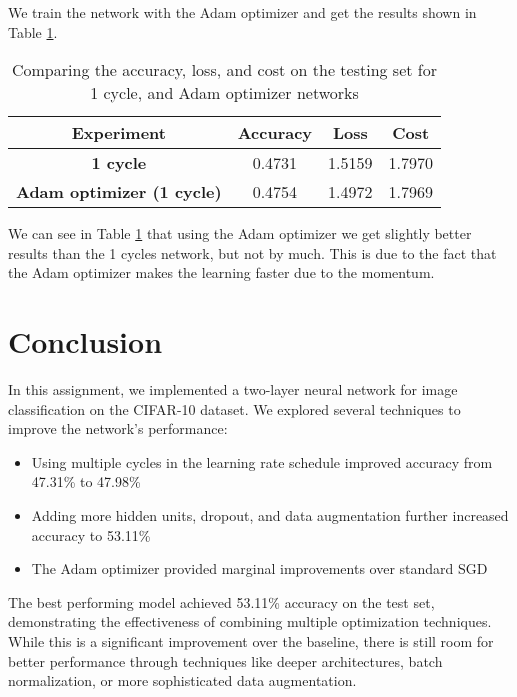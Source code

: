 \documentclass{article}
\begin{document}

We train the network with the Adam optimizer and get the results shown in Table \ref{tab:experiment4}.

\begin{table}[h!]
    \centering
    \begin{tabular}{|c|c|c|c|}
    \hline
    \textbf{Experiment} & \textbf{Accuracy} & \textbf{Loss} & \textbf{Cost} \\
    \hline
    \textbf{1 cycle} & 0.4731 & 1.5159 & 1.7970 \\
    \textbf{Adam optimizer (1 cycle)} & 0.4754 & 1.4972 & 1.7969 \\
    \hline
    \end{tabular}
    \caption{Comparing the accuracy, loss, and cost on the testing set for 1 cycle, and Adam optimizer networks}
    \label{tab:experiment4}
\end{table}

We can see in Table \ref{tab:experiment4} that using the Adam optimizer we get slightly better results than the 1 cycles network, but not by much. This is due to the fact that the Adam optimizer makes the learning faster due to the momentum.


\newpage

\section{Conclusion}
In this assignment, we implemented a two-layer neural network for image classification on the CIFAR-10 dataset. We explored several techniques to improve the network's performance:

\begin{itemize}
    \item Using multiple cycles in the learning rate schedule improved accuracy from 47.31\% to 47.98\%
    \item Adding more hidden units, dropout, and data augmentation further increased accuracy to 53.11\%
    \item The Adam optimizer provided marginal improvements over standard SGD
\end{itemize}

The best performing model achieved 53.11\% accuracy on the test set, demonstrating the effectiveness of combining multiple optimization techniques. While this is a significant improvement over the baseline, there is still room for better performance through techniques like deeper architectures, batch normalization, or more sophisticated data augmentation.
\end{document}
